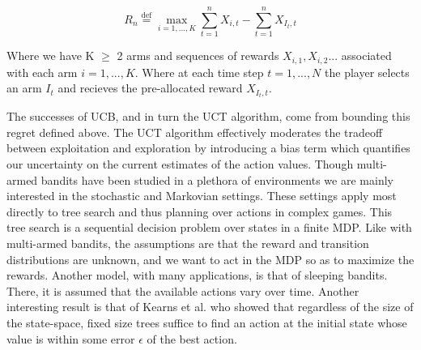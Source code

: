 \documentclass[a4paper,12pt]{proposal}
\newcommand*{\defeq}{\stackrel{\text{def}}{=}}
\begin{document}
\begin{equation}
R_n \defeq \max_{i=1,...,K} \sum_{t=1}^n X_{i,t} - \sum_{t=1}^n X_{I_t,t}
\end{equation}

Where we have K \(\geq\) 2 arms and sequences of rewards \(X_{i,1},X_{i,2}...\) associated with each arm \( i = 1,...,K\). Where at each time step \( t=1,...,N\) the player selects an arm \(I_t\) and recieves the pre-allocated reward \(X_{I_t,t}\).

The successes of UCB, and in turn the UCT algorithm, come from bounding this regret defined above. The UCT algorithm effectively moderates the tradeoff between exploitation and exploration by introducing a bias term which quantifies our uncertainty on the current estimates of the action values.
Though multi-armed bandits have been studied in a plethora of environments we are mainly interested in the stochastic and Markovian settings. These settings apply most directly to tree search and thus planning over actions in complex games. This tree search is a sequential decision problem over states in a finite MDP. Like with multi-armed bandits, the assumptions are that the reward and transition distributions are unknown, and we want to act in the MDP so as to maximize the rewards. Another model, with many applications, is that of sleeping bandits. There, it is assumed that the available actions vary over time. \cite{regretAnalysis} 
Another interesting result is that of Kearns et al. who showed that regardless of the size of the state-space, fixed size trees suffice to find an action at the initial state whose value is within some error \(\epsilon\) of the best action. \cite{Kearns2002}
\end{document}
